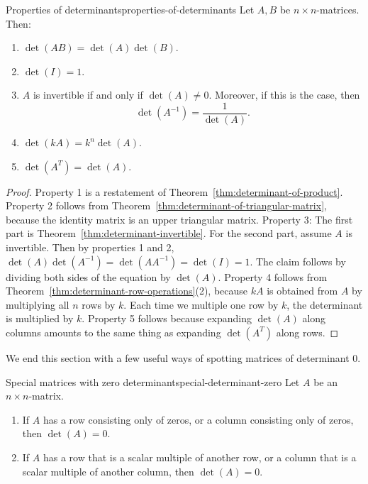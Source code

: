 \begin{theorem}{Properties of determinants}{properties-of-determinants}
  Let $A,B$ be $n\times n$-matrices. Then:%
  \begin{enumerate}
  \item $\det(AB)=\det(A)\det(B)$.
  \item $\det(I) = 1$.
  \item $A$ is invertible if and only if $\det(A)\neq 0$. Moreover, if
    this is the case, then
    \begin{equation*}
      \det(A^{-1}) = \frac{1}{\det(A)}.
    \end{equation*}
  \item $\det(kA)=k^n\det(A)$.
  \item $\det(A^T) = \det(A)$.
  \end{enumerate}
\end{theorem}

\begin{proof}
  Property 1 is a restatement of
  Theorem~\ref{thm:determinant-of-product}. Property 2 follows from
  Theorem~\ref{thm:determinant-of-triangular-matrix}, because the
  identity matrix is an upper triangular matrix. Property 3: The first
  part is Theorem~\ref{thm:determinant-invertible}. For the second
  part, assume $A$ is invertible. Then by properties 1 and 2,
  $\det(A)\det(A^{-1}) = \det(AA^{-1}) = \det(I) = 1$. The claim
  follows by dividing both sides of the equation by
  $\det(A)$. Property 4 follows from
  Theorem~\ref{thm:determinant-row-operations}(2), because $kA$ is
  obtained from $A$ by multiplying all $n$ rows by $k$. Each time we
  multiple one row by $k$, the determinant is multiplied by
  $k$. Property 5 follows because expanding $\det(A)$ along columns
  amounts to the same thing as expanding $\det(A^T)$ along rows.
\end{proof}

We end this section with a few useful ways of spotting matrices of
determinant 0.

\begin{theorem}{Special matrices with zero determinant}{special-determinant-zero}
  Let $A$ be an $n\times n$-matrix.
  \begin{enumerate}
  \item If $A$ has a row consisting only of zeros, or a column
    consisting only of zeros, then $\det(A)=0$.
  \item If $A$ has a row that is a scalar multiple of another row, or
    a column that is a scalar multiple of another column, then
    $\det(A)=0$. 
  \end{enumerate}
\end{theorem}

